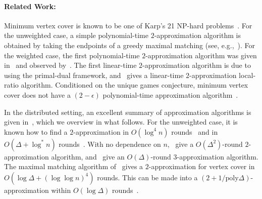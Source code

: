 \documentclass[11pt]{article}
\begin{document}
\paragraph{Related Work:}
Minimum vertex cover is known to be one of Karp's 21 NP-hard problems~\cite{Karp72}. For the unweighted case, a simple polynomial-time $2$-approximation algorithm is obtained by taking the endpoints of a greedy maximal matching (see, e.g.,~\cite{Cormen2009,GareyJ79}). For the weighted case, the first polynomial-time $2$-approximation algorithm was given in~\cite{NemhauserT75} and observed by~\cite{Hochbaum82}. The first linear-time $2$-approximation algorithm is due to~\cite{BarYehudaE81} using the primal-dual framework, and~\cite{BarYehudaE1985} gives a linear-time $2$-approximation local-ratio algorithm. Conditioned on the unique games conjecture, minimum vertex cover does not have a $(2-\epsilon)$ polynomial-time approximation algorithm~\cite{KhotR08}.

In the distributed setting, an excellent summary of approximation algorithms is given in~\cite{AstrandS10}, which we overview in what follows. For the unweighted case, it is known how to find a $2$-approximation in $O(\log^4{n})$ rounds~\cite{HanckowiakKP01} and in $O(\Delta+\log^{*}{n})$ rounds~\cite{PanconesiR01}. With no dependence on $n$,~\cite{AstrandFPRSU09} give a $O(\Delta^2)$-round $2$-approximation algorithm, and~\cite{PolishchukS09} give an $O(\Delta)$-round $3$-approximation algorithm. The maximal matching algorithm of~\cite{BarenboimEPS12} gives a $2$-approximation for vertex cover in $O(\log{\Delta}+(\log\log{n})^4)$ rounds. This can be made into a $(2+1/\text{poly}{\Delta})$-approximation within $O(\log{\Delta})$ rounds~\cite{PettiePersonal}.

\end{document}

